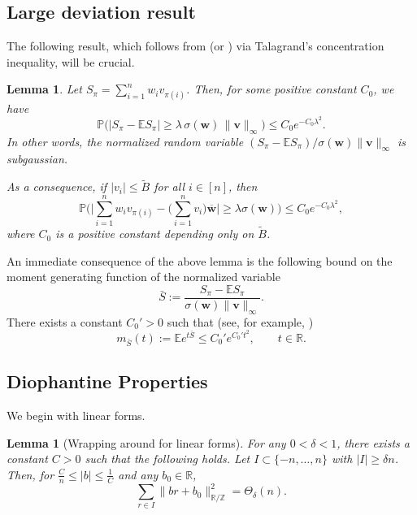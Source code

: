 \documentclass[reqno]{amsart}
\newcommand\R{{\mathbb{R}}}
\newcommand\Z{{\mathbb{Z}}}
\renewcommand\P{{\mathbb{P}}}
\newcommand\BMv{{\bm v}}
\newcommand\BMw{{\bm w}}
\theoremstyle{plain}
\newtheorem{lemma}[theorem]{Lemma}
\theoremstyle{definition}
\begin{document}
\subsection{Large deviation result}

The following result, which follows from \cite[Theorem 3.1]{AChW} (or \cite[Corollary 2.3]{Vuetal}) via Talagrand's concentration inequality, will be crucial.

\begin{lemma}\label{lemma:deviation}
Let $S_{\pi} = \sum_{i=1}^{n} w_i v_{\pi(i)}$. Then, for some positive constant $C_0$, we have
\[
\P\Big( | S_{\pi} - \mathbb{E} S_{\pi} | \ge \lambda \, \sigma(\BMw) \, \| \BMv \|_{\infty} \Big) \le C_0 e^{-C_0 \lambda^2}.
\]
In other words, the normalized random variable $(S_{\pi} - \mathbb{E} S_{\pi})/\sigma(\BMw) \| \BMv \|_{\infty}$ is subgaussian. 

As a consequence, if $|v_{i}|\le \widetilde{B}$ for all $i\in [n]$, then
    \[
    \P\Big( \Big| \sum_{i=1}^{n} w_{i} v_{\pi(i)} - \Big( \sum_{i=1}^{n} v_{i} \Big) \overline{\BMw} \Big| \ge \lambda  \sigma(\BMw) \Big) \le C_0 e^{-C_0 \lambda^2},
    \]
where $C_0$ is a positive constant depending only on $\widetilde{B}$.
\end{lemma}

An immediate consequence of the above lemma is the following bound on the moment generating function of the normalized variable
\[
\bar{S} := \frac{S_{\pi} - \mathbb{E} S_{\pi}}{\sigma(\BMw)\|\BMv\|_{\infty}}.
\]
There exists a constant $C_0'>0$ such that (see, for example, \cite[Proposition 2.6.1]{VerHDP})
\begin{equation}\label{eqn:mgf:1}
m_{\bar{S}}(t) := \mathbb{E} e^{t\bar{S}}
\le C_0' e^{C_0' t^2}, \qquad t\in\R.
\end{equation}

\subsection{Diophantine Properties}

We begin with linear forms.

\begin{lemma}[Wrapping around for linear forms]\label{lemma:wraparound}
For any $0<\delta<1$, there exists a constant $C>0$ such that the following holds. 
Let $I\subset\{-n,\dots,n\}$ with $|I|\ge \delta n$. Then, for $\frac{C}{n}\le |b|\le \frac{1}{C}$ and any $b_0\in\R$,
\[
\sum_{r\in I} \|br+b_0\|_{\R/\Z}^2=\Theta_{\delta}(n).
\]
\end{lemma}
\end{document}
